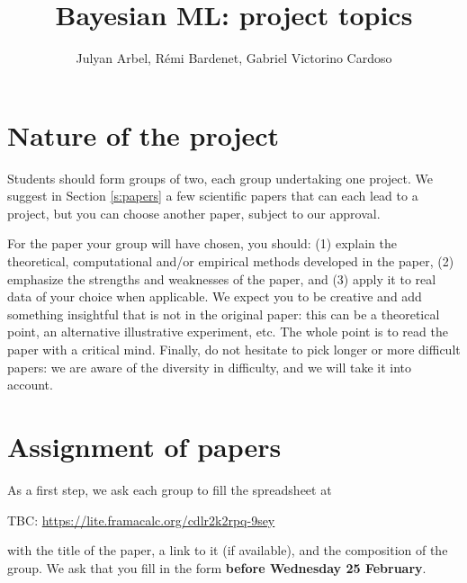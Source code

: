 \documentclass[12pt]{article}%
\date{}
\begin{document}
\title{Bayesian ML: project topics}
\author{Julyan Arbel, R\'emi Bardenet, Gabriel Victorino Cardoso}
\maketitle

\section{Nature of the project}
Students should form groups of two, each group undertaking one project. We suggest in Section \ref{s:papers} a few scientific papers that can each lead to a project, but you can choose another paper, subject to our approval.

For the paper your group will have chosen, you should: (1) explain the theoretical, computational and/or empirical methods developed in the paper, (2) emphasize the strengths and weaknesses of the paper, and (3) apply it to real data of your choice when applicable. 
We expect you to be creative and add something insightful that is not in the original paper: this can be a theoretical point, an alternative illustrative experiment, etc. The whole point is to read the paper with a critical mind.
Finally, do not hesitate to pick longer or more difficult papers: we are aware of the diversity in difficulty, and we will take it into account.

\section{Assignment of papers}
As a first step, we ask each group to fill the spreadsheet at
\begin{center}
   TBC: \href{https://lite.framacalc.org/cdlr2k2rpq-9sey}{https://lite.framacalc.org/cdlr2k2rpq-9sey}
\end{center}
with the title of the paper, a link to it (if available), and the composition of the group.
We ask that you fill in the form {\bf before Wednesday 25 February}. 
\end{document}
